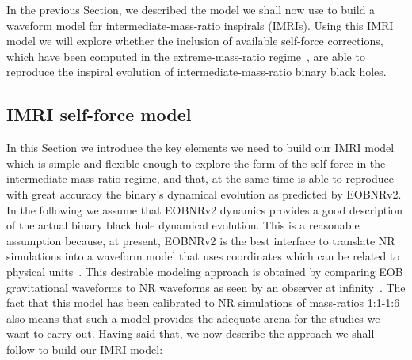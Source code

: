  In the previous Section, we described the model we shall now use to build a waveform model for intermediate-mass-ratio inspirals (IMRIs). Using this IMRI model we will explore whether the inclusion of available self-force corrections, which have been computed in the extreme-mass-ratio regime~\cite{baracknewphi,sago,inner}, are able to reproduce the inspiral evolution of intermediate-mass-ratio binary black holes. 
 
 
 \subsection{IMRI self-force model}
 
 In this Section we introduce the key elements we need to build our IMRI model which is simple and flexible enough to explore the form of the self-force in the intermediate-mass-ratio regime, and that, at the same time is able to reproduce with great accuracy the binary's dynamical evolution as predicted by EOBNRv2. In the following we assume that EOBNRv2 dynamics provides a good description of the actual binary black hole dynamical evolution. This is a reasonable assumption because, at present, EOBNRv2 is the best interface to translate NR simulations into a waveform model that uses coordinates which can be related to physical units~\cite{damsh}. This desirable modeling approach is obtained by comparing EOB gravitational waveforms to NR waveforms as seen by an observer at infinity~\cite{NRPNComparisonBoyleetal}.  The fact that this model has been calibrated to NR simulations of mass-ratios 1:1-1:6 also means that such a model provides the adequate arena for the studies we want to carry out.  Having said 
that, we now describe 
the approach we shall follow to build our IMRI model:
 
